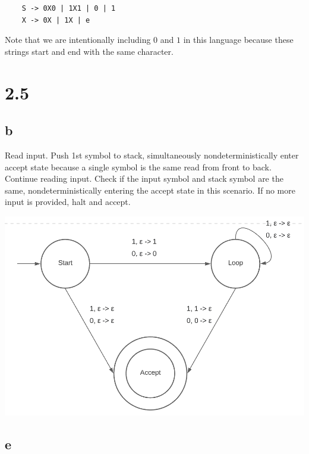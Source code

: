 \documentclass{article}
\begin{document}
\begin{center}
    
    \begin{lstlisting}
    S -> 0X0 | 1X1 | 0 | 1
    X -> 0X | 1X | e
    \end{lstlisting}
    
\end{center}

Note that we are intentionally including $0$ and $1$ in this language because these strings start and end with the same character.

\section*{2.5}

\subsection*{b}

Read input. Push 1st symbol to stack, simultaneously nondeterministically enter accept state because a single symbol is the same read from front to back. Continue reading input. Check if the input symbol and stack symbol are the same, nondeterministically entering the accept state in this scenario. If no more input is provided, halt and accept. 

\begin{center}
    \includegraphics[scale=1]{25b.png}
\end{center}

\newpage
\subsection*{e}
\end{document}
